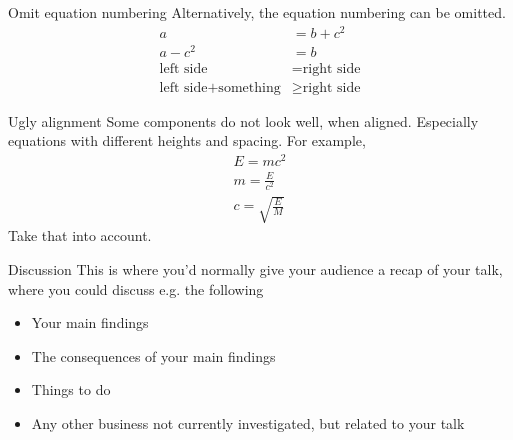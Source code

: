 \documentclass[aspectratio=169]{beamer} %
\begin{document}
\begin{frame}{Omit equation numbering}
    Alternatively, the equation numbering can be omitted.
 \begin{align*}
    a & = b + c^2\\
    a - c^2 & = b\\
    \text{left side} & = \text{right side}\\
    \text{left side} + \text{something} & \geq \text{right side}
\end{align*}
\end{frame}

\begin{frame}{Ugly alignment}
    Some components do not look well, when aligned. Especially equations with different heights and spacing. For example,
\begin{align}
    E = mc^2\\
    m = \frac{E}{c^2}\\
    c = \sqrt{\frac{E}{M}}
\end{align}
Take that into account.
\end{frame}

\begin{frame}{Discussion}
    This is where you'd normally give your audience a recap of your talk, where you could discuss e.g. the following\begin{itemize}
        \item Your main findings
        \item The consequences of your main findings
        \item Things to do
        \item Any other business not currently investigated, but related to your talk
    \end{itemize}
\end{frame}
\end{document}
